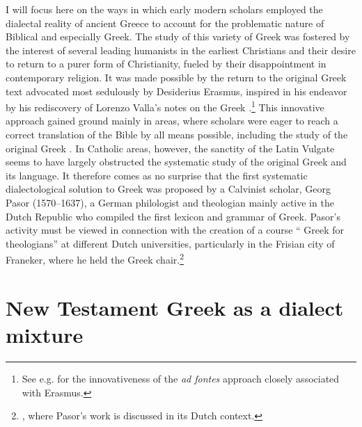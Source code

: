 I will focus here on the ways in which early modern scholars employed the dialectal reality of ancient Greece to account for the problematic nature of Biblical and especially  Greek. The study of this variety of Greek was fostered by the interest of several leading humanists in the earliest Christians and their desire to return to a purer form of Christianity, fueled by their disappointment in contemporary religion. It was made possible by the return to the original Greek text advocated most sedulously by Desiderius Erasmus, inspired in his endeavor by his rediscovery of Lorenzo Valla’s notes on the Greek .\footnote{See e.g. \citet[esp. 31]{Bentley1983} for the innovativeness of the \textit{ad fontes} approach closely associated with Erasmus.} This innovative approach gained ground mainly in  areas, where scholars were eager to reach a correct  translation of the Bible by all means possible, including the study of the original Greek . In Catholic areas, however, the sanctity of the Latin Vulgate seems to have largely obstructed the systematic study of the original Greek  and its language. It therefore comes as no surprise that the first systematic dialectological solution to  Greek was proposed by a Calvinist scholar, Georg Pasor (1570–1637), a German philologist and theologian mainly active in the Dutch Republic who compiled the first lexicon and grammar of  Greek. Pasor’s activity must be viewed in connection with the creation of a course “ Greek for theologians” at different Dutch universities, particularly in the Frisian city of Franeker, where he held the Greek chair.\footnote{, where Pasor’s work is discussed in its Dutch context.}

\section{New Testament Greek as a dialect mixture}\label{sec:4.5}

